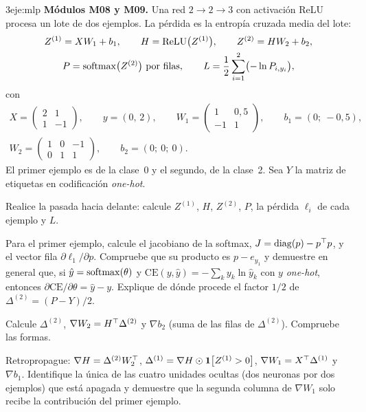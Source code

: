 \begin{ejercicio}{3}{eje:mlp}
\textbf{Módulos M08 y M09.} Una red $2\to 2\to 3$ con activación ReLU procesa un lote de dos ejemplos. La pérdida es la entropía cruzada media del lote:
\begin{gather*}
Z^{(1)}=XW_1+b_1,\qquad H=\operatorname{ReLU}\bigl(Z^{(1)}\bigr),\qquad Z^{(2)}=HW_2+b_2,\\
P=\operatorname{softmax}\bigl(Z^{(2)}\bigr)\ \text{por filas},\qquad L=\frac12\sum_{i=1}^{2}\bigl(-\ln P_{i,y_i}\bigr),
\end{gather*}
con
\begin{gather*}
X=\begin{pmatrix}2&1\\1&-1\end{pmatrix},\qquad y=(0,\,2),\qquad
W_1=\begin{pmatrix}1&0{,}5\\-1&1\end{pmatrix},\qquad b_1=(0;\ -0{,}5),\\
W_2=\begin{pmatrix}1&0&-1\\0&1&1\end{pmatrix},\qquad b_2=(0;\ 0;\ 0).
\end{gather*}
El primer ejemplo es de la clase~0 y el segundo, de la clase~2. Sea $Y$ la matriz de etiquetas en codificación \emph{one-hot}.
\begin{apartados}
  \item {} Realice la pasada hacia delante: calcule $Z^{(1)}$, $H$, $Z^{(2)}$, $P$, la pérdida $\ell_i$ de cada ejemplo y $L$.
  \item {} Para el primer ejemplo, calcule el jacobiano de la softmax, $J=\operatorname{diag}(p)-p^{\top} p$, y el vector fila $\partial\ell_1/\partial p$. Compruebe que su producto es $p-e_{y_1}$ y demuestre en general que, si $\hat y=\operatorname{softmax}(\theta)$ y $\mathrm{CE}(y,\hat y)=-\sum_k y_k\ln\hat y_k$ con $y$ \emph{one-hot}, entonces $\partial\mathrm{CE}/\partial\theta=\hat y-y$. Explique de dónde procede el factor $1/2$ de $\Delta^{(2)}=(P-Y)/2$.
  \item {} Calcule $\Delta^{(2)}$, $\nabla W_2=H^{\top}\Delta^{(2)}$ y $\nabla b_2$ (suma de las filas de $\Delta^{(2)}$). Compruebe las formas.
  \item {} Retropropague: $\nabla H=\Delta^{(2)}W_2^{\top}$, $\Delta^{(1)}=\nabla H\odot\mathbf{1}\bigl[Z^{(1)}>0\bigr]$, $\nabla W_1=X^{\top}\Delta^{(1)}$ y $\nabla b_1$. Identifique la única de las cuatro unidades ocultas (dos neuronas por dos ejemplos) que está apagada y demuestre que la segunda columna de $\nabla W_1$ solo recibe la contribución del primer ejemplo.

\end{apartados}
\end{ejercicio}
